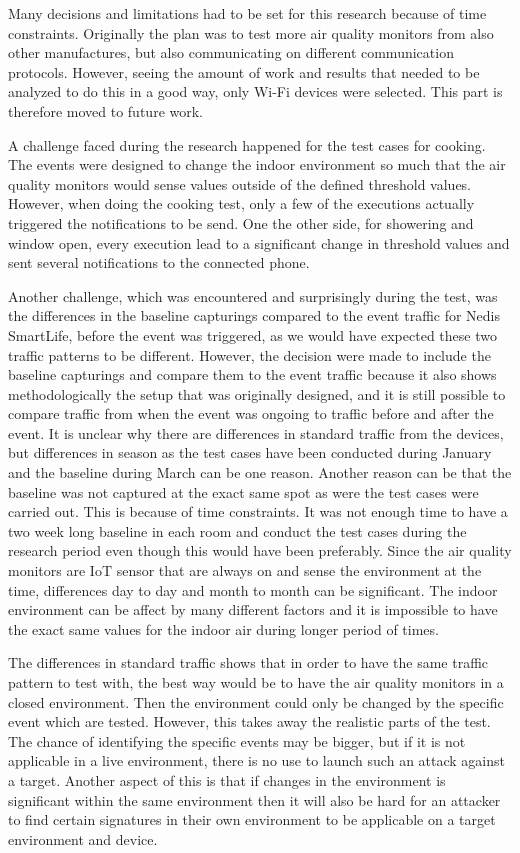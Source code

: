 Many decisions and limitations had to be set for this research because of time constraints. Originally the plan was to test more air quality monitors from also other manufactures, but also communicating on different communication protocols. However, seeing the amount of work and results that needed to be analyzed to do this in a good way, only \gls{Wi-Fi} devices were selected. This part is therefore moved to future work.  

A challenge faced during the research happened for the test cases for cooking. The events were designed to change the indoor environment so much that the air quality monitors would sense values outside of the defined threshold values. However, when doing the cooking test, only a few of the executions actually triggered the notifications to be send. One the other side, for showering and window open, every execution lead to a significant change in threshold values and sent several notifications to the connected phone. 

Another challenge, which was encountered and surprisingly during the test, was the differences in the baseline capturings compared to the event traffic for Nedis SmartLife, before the event was triggered, as we would have expected these two traffic patterns to be different. However, the decision were made to include the baseline capturings and compare them to the event traffic because it also shows methodologically the setup that was originally designed, and it is still possible to compare traffic from when the event was ongoing to traffic before and after the event. It is unclear why there are differences in standard traffic from the devices, but differences in season as the test cases have been conducted during January and the baseline during March can be one reason. Another reason can be that the baseline was not captured at the exact same spot as were the test cases were carried out. This is because of time constraints. It was not enough time to have a two week long baseline in each room and conduct the test cases during the research period even though this would have been preferably. Since the air quality monitors are \gls{IoT} sensor that are always on and sense the environment at the time, differences day to day and month to month can be significant. The indoor environment can be affect by many different factors and it is impossible to have the exact same values for the indoor air during longer period of times. 

The differences in standard traffic shows that in order to have the same traffic pattern to test with, the best way would be to have the air quality monitors in a closed environment. Then the environment could only be changed by the specific event which are tested. However, this takes away the realistic parts of the test. The chance of identifying the specific events may be bigger, but if it is not applicable in a live environment, there is no use to launch such an attack against a target. Another aspect of this is that if changes in the environment is significant within the same environment then it will also be hard for an attacker to find certain signatures in their own environment to be applicable on a target environment and device. 